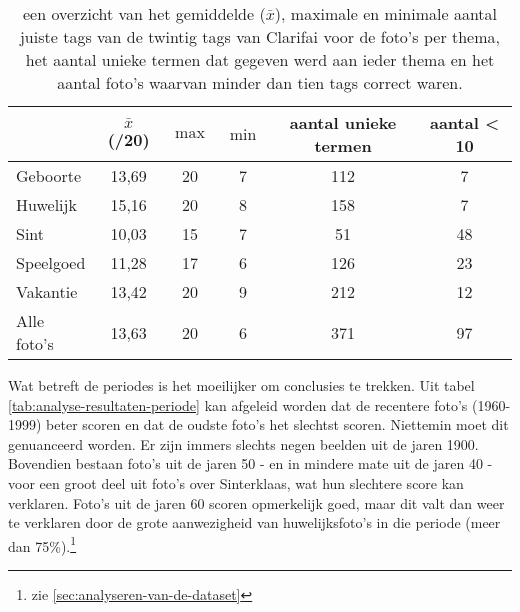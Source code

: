 \begin{table}
    \renewcommand\arraystretch{1.2}
    \centering
	\begin{tabular}{p{3cm}|ccccc}
	 	\toprule
		 & $\bar{x}$ (/20) & $\max$ & $\min$ & aantal unieke termen & aantal < 10 \\ 
		\midrule
		Geboorte & 13,69 & 20 & 7 & 112 & 7 \\ 
		Huwelijk & 15,16 & 20 & 8 & 158 & 7 \\ 
		Sint & 10,03 & 15 & 7 & 51 & 48 \\ 
		Speelgoed & 11,28 & 17 & 6 & 126 & 23 \\ 
		Vakantie & 13,42 & 20 & 9 & 212 & 12 \\ 
		Alle foto's & 13,63 & 20 & 6 & 371 & 97 \\ 
	\bottomrule
	\end{tabular} 
	\caption[een overzicht van de resultaten per thema na gebruikt van het ingebouwde model van Clarifai]{een overzicht van het gemiddelde ($\bar{x}$), maximale en minimale aantal juiste tags van de twintig tags van Clarifai voor de foto’s per thema, het aantal unieke termen dat gegeven werd aan ieder thema en het aantal foto’s waarvan minder dan tien tags correct waren. }
	\label{tab:analyse-resultaten-thema}
\end{table}

Wat betreft de periodes is het moeilijker om conclusies te trekken. Uit tabel \ref{tab:analyse-resultaten-periode} kan afgeleid worden dat de recentere foto’s (1960-1999) beter scoren en dat de oudste foto’s het slechtst scoren. Niettemin moet dit genuanceerd worden. Er zijn immers slechts negen beelden uit de jaren 1900. Bovendien bestaan foto’s uit de jaren 50 - en in mindere mate uit de jaren 40 - voor een groot deel uit foto’s over Sinterklaas, wat hun slechtere score kan verklaren. Foto’s uit de jaren 60 scoren opmerkelijk goed, maar dit valt dan weer te verklaren door de grote aanwezigheid van huwelijksfoto’s in die periode (meer dan 75\%).\footnote{zie \ref{sec:analyseren-van-de-dataset}}

